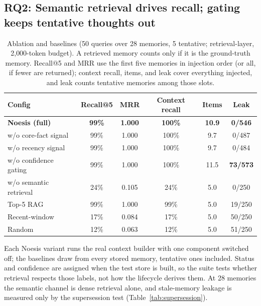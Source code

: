 \documentclass[11pt]{article}
\begin{document}
\subsection{RQ2: Semantic retrieval drives recall; gating keeps tentative thoughts out}
\label{sec:ablation}

\begin{table}[!htbp]
  \centering
  \caption{Ablation and baselines (50 queries over 28 memories, 5 tentative;
  retrieval-layer, 2{,}000-token budget). A retrieved memory counts only if it
  is the ground-truth memory. Recall@5 and MRR use the first five memories in
  injection order (or all, if fewer are returned); context recall, items, and
  leak cover everything injected, and leak counts tentative memories among those
  slots.}
  \label{tab:ablation}
  \begin{tabular}{lccccc}
    \toprule
    \textbf{Config} & \textbf{Recall@5} & \textbf{MRR} & \textbf{Context recall} & \textbf{Items} & \textbf{Leak} \\
    \midrule
    \textbf{Noesis (full)}   & \textbf{99\%} & \textbf{1.000} & \textbf{100\%} & \textbf{10.9} & \textbf{0/546} \\
    w/o core-fact signal     & 99\% & 1.000 & 100\% & 9.7  & 0/487 \\
    w/o recency signal       & 99\% & 1.000 & 100\% & 9.7  & 0/484 \\
    w/o confidence gating    & 99\% & 1.000 & 100\% & 11.5 & \textbf{73/573} \\
    w/o semantic retrieval   & 24\% & 0.105 & 24\%  & 5.0  & 0/250 \\
    \midrule
    Top-5 RAG                & 99\% & 1.000 & 99\%  & 5.0  & 19/250 \\
    Recent-window            & 17\% & 0.084 & 17\%  & 5.0  & 50/250 \\
    Random                   & 12\% & 0.063 & 12\%  & 5.0  & 51/250 \\
    \bottomrule
  \end{tabular}
\end{table}

Each Noesis variant runs the real context builder with one component switched
off; the baselines draw from every stored memory, tentative ones included.
Status and confidence are assigned when the test store is built, so the suite
tests whether retrieval respects those labels, not how the lifecycle derives
them. At 28 memories the semantic channel is dense retrieval alone, and
stale-memory leakage is measured only by the supersession test
(Table~\ref{tab:supersession}).
\end{document}
